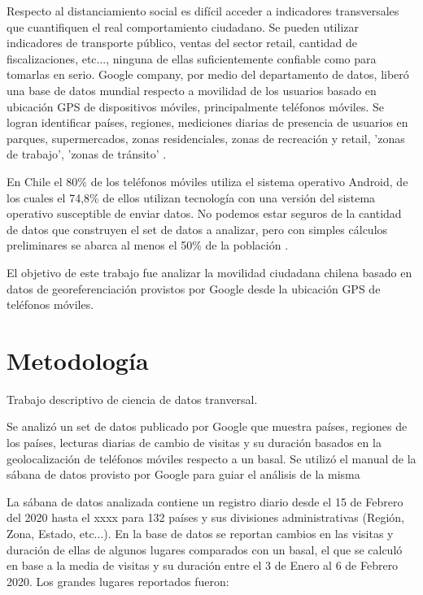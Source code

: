 \documentclass{article}
\begin{document}
Respecto al distanciamiento social es difícil acceder a indicadores transversales que cuantifiquen el real comportamiento ciudadano. Se pueden utilizar indicadores de transporte público, ventas del sector retail, cantidad de fiscalizaciones, etc..., ninguna de ellas suficientemente confiable como para tomarlas en serio. Google company, por medio del departamento de datos, liberó una base de datos mundial respecto a movilidad de los usuarios basado en ubicación GPS de dispositivos móviles, principalmente teléfonos móviles. Se logran identificar países, regiones, mediciones diarias de presencia de usuarios en parques, supermercados, zonas residenciales, zonas de recreación y retail, 'zonas de trabajo', 'zonas de tránsito' \cite{google_covid-19_2020,our_world_in_data_google_2020}.

En Chile el 80\% de los teléfonos móviles utiliza el sistema operativo Android, de los cuales el 74,8\% de ellos utilizan tecnología con una versión del sistema operativo susceptible de enviar datos. No podemos estar seguros de la cantidad de datos que construyen el set de datos a analizar, pero con simples cálculos preliminares se abarca al menos el 50\% de la población \cite{statcounter_mobile_nodate, android_developer_panel_nodate, casas_iphone_nodate}.

El objetivo de este trabajo fue analizar la movilidad ciudadana chilena basado en datos de georeferenciación provistos por Google desde la ubicación GPS de teléfonos móviles.


\section{Metodología}
Trabajo descriptivo de ciencia de datos tranversal. 


Se analizó un set de datos publicado por Google  \cite{google_covid-19_2020} que muestra países, regiones de los países, lecturas diarias de cambio de visitas y su duración basados en la geolocalización de teléfonos móviles respecto a un basal. Se utilizó el manual de la sábana de datos provisto por Google para guiar el análisis de la misma \cite{google_mobility_2020}

La sábana de datos analizada contiene un registro diario desde el  15 de Febrero del 2020 hasta el xxxx para 132 países y sus divisiones administrativas (Región, Zona, Estado, etc...). En la base de datos se reportan cambios en las visitas y duración de ellas de algunos lugares comparados con un basal, el que se calculó en base a la media de visitas y su duración entre el 3 de Enero al 6 de Febrero 2020. Los grandes lugares reportados fueron:
\end{document}
